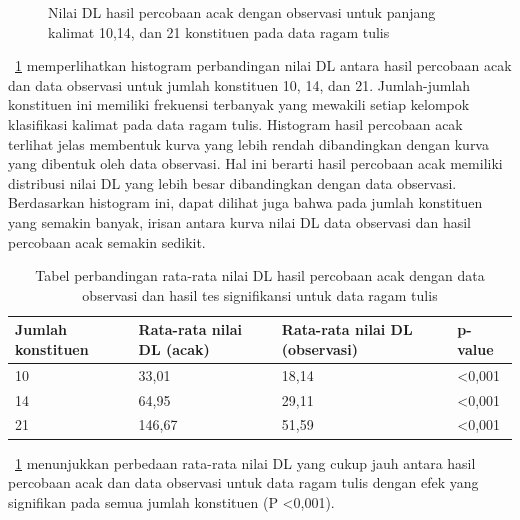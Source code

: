 \begin{figure}
\caption{Nilai DL hasil percobaan acak dengan observasi untuk panjang kalimat 10,14, dan 21 konstituen pada data ragam tulis}
\label{fig:trandomobs}
\end{figure}

\pic~\ref{fig:trandomobs} memperlihatkan histogram perbandingan nilai DL antara hasil percobaan acak dan data observasi untuk jumlah konstituen 10, 14, dan 21. Jumlah-jumlah konstituen ini memiliki frekuensi terbanyak yang mewakili setiap kelompok klasifikasi kalimat pada data ragam tulis.  Histogram hasil percobaan acak terlihat jelas membentuk kurva yang lebih rendah dibandingkan dengan kurva yang dibentuk oleh data observasi. Hal ini berarti hasil percobaan acak memiliki distribusi nilai DL yang lebih besar dibandingkan dengan data observasi. Berdasarkan histogram ini, dapat dilihat juga bahwa pada jumlah konstituen yang semakin banyak, irisan antara kurva nilai DL data observasi dan hasil percobaan acak semakin sedikit.

\begin{table}
\begin{center}
\begin{small}
  \caption{Tabel perbandingan rata-rata nilai DL hasil percobaan acak dengan data observasi dan hasil tes signifikansi untuk data ragam tulis}  \label{tab:perbandingan_DL_tulis}
  \begin{tabular}{ | l | l | l | l |}
    \hline
    	Jumlah konstituen & Rata-rata nilai DL (acak) & Rata-rata nilai DL (observasi) & p-value \\ \hline
	10 & 33,01 & 18,14 & \textless 0,001 \\ \hline
	14 & 64,95 & 29,11 & \textless 0,001 \\ \hline
	21 & 146,67 & 51,59 & \textless 0,001 \\ \hline
  \end{tabular}
  \end{small}
\end{center}
\end{table}

\tab~\ref{tab:perbandingan_DL_tulis} menunjukkan perbedaan rata-rata nilai DL yang cukup jauh antara hasil percobaan acak dan data observasi untuk data ragam tulis dengan efek yang signifikan pada semua jumlah konstituen (P \textless 0,001). 

